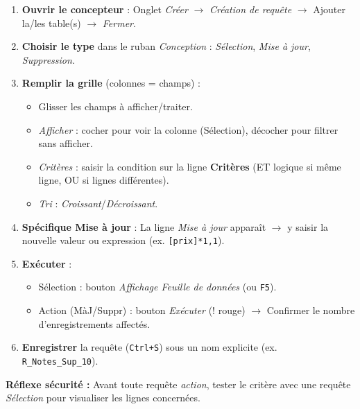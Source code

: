 \documentclass[11pt]{article}
\begin{document}
\begin{methode}
\begin{enumerate}
\item \textbf{Ouvrir le concepteur} : Onglet \emph{Créer} $\to$ \emph{Création de requête} $\to$ Ajouter la/les table(s) $\to$ \emph{Fermer}.
\item \textbf{Choisir le type} dans le ruban \emph{Conception} : \emph{Sélection}, \emph{Mise à jour}, \emph{Suppression}.
\item \textbf{Remplir la grille} (colonnes = champs) :
\begin{itemize}
\item Glisser les champs à afficher/traiter.
\item \emph{Afficher} : cocher pour voir la colonne (Sélection), décocher pour filtrer sans afficher.
\item \emph{Critères} : saisir la condition sur la ligne \textbf{Critères} (ET logique si même ligne, OU si lignes différentes).
\item \emph{Tri} : \emph{Croissant}/\emph{Décroissant}.
\end{itemize}
\item \textbf{Spécifique Mise à jour} : La ligne \emph{Mise à jour} apparaît $\to$ y saisir la nouvelle valeur ou expression (ex. \texttt{[prix]*1,1}).
\item \textbf{Exécuter} :
\begin{itemize}
\item Sélection : bouton \emph{Affichage Feuille de données} (ou \texttt{F5}).
\item Action (MàJ/Suppr) : bouton \emph{Exécuter} (! rouge) $\to$ Confirmer le nombre d'enregistrements affectés.
\end{itemize}
\item \textbf{Enregistrer} la requête (\texttt{Ctrl+S}) sous un nom explicite (ex. \texttt{R\_Notes\_Sup\_10}).
\end{enumerate}
\textbf{Réflexe sécurité :} Avant toute requête \emph{action}, tester le critère avec une requête \emph{Sélection} pour visualiser les lignes concernées.
\end{methode}
\end{document}
